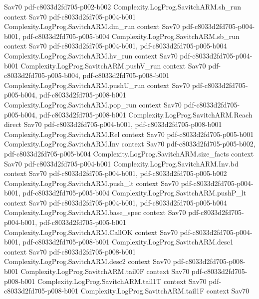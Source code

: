 \begin{theorem}
  {Sav70}
  {pdf-c8033d2fd705-p002-b002}
\proofstep
  {Complexity.LogProg.SavitchARM.sh_run}
  {context}
  {Sav70}
  {pdf-c8033d2fd705-p004-b001}
\proofstep
  {Complexity.LogProg.SavitchARM.dm_run}
  {context}
  {Sav70}
  {pdf-c8033d2fd705-p004-b001,
    pdf-c8033d2fd705-p005-b004}
\proofstep
  {Complexity.LogProg.SavitchARM.sb_run}
  {context}
  {Sav70}
  {pdf-c8033d2fd705-p004-b001,
    pdf-c8033d2fd705-p005-b004}
\proofstep
  {Complexity.LogProg.SavitchARM.hv_run}
  {context}
  {Sav70}
  {pdf-c8033d2fd705-p004-b001}
\proofstep
  {Complexity.LogProg.SavitchARM.pushV_run}
  {context}
  {Sav70}
  {pdf-c8033d2fd705-p005-b004,
    pdf-c8033d2fd705-p008-b001}
\proofstep
  {Complexity.LogProg.SavitchARM.pushU_run}
  {context}
  {Sav70}
  {pdf-c8033d2fd705-p005-b004,
    pdf-c8033d2fd705-p008-b001}
\proofstep
  {Complexity.LogProg.SavitchARM.pop_run}
  {context}
  {Sav70}
  {pdf-c8033d2fd705-p005-b004,
    pdf-c8033d2fd705-p008-b001}
\proofstep
  {Complexity.LogProg.SavitchARM.Reach}
  {direct}
  {Sav70}
  {pdf-c8033d2fd705-p004-b001,
    pdf-c8033d2fd705-p008-b001}
\proofstep
  {Complexity.LogProg.SavitchARM.Rel}
  {context}
  {Sav70}
  {pdf-c8033d2fd705-p005-b001}
\proofstep
  {Complexity.LogProg.SavitchARM.Inv}
  {context}
  {Sav70}
  {pdf-c8033d2fd705-p005-b002,
    pdf-c8033d2fd705-p005-b004}
\proofstep
  {Complexity.LogProg.SavitchARM.size_facts}
  {context}
  {Sav70}
  {pdf-c8033d2fd705-p004-b001}
\proofstep
  {Complexity.LogProg.SavitchARM.Inv.bd}
  {context}
  {Sav70}
  {pdf-c8033d2fd705-p004-b001,
    pdf-c8033d2fd705-p005-b002}
\proofstep
  {Complexity.LogProg.SavitchARM.push_lt}
  {context}
  {Sav70}
  {pdf-c8033d2fd705-p004-b001,
    pdf-c8033d2fd705-p005-b004}
\proofstep
  {Complexity.LogProg.SavitchARM.pushP_lt}
  {context}
  {Sav70}
  {pdf-c8033d2fd705-p004-b001,
    pdf-c8033d2fd705-p005-b004}
\proofstep
  {Complexity.LogProg.SavitchARM.base_spec}
  {context}
  {Sav70}
  {pdf-c8033d2fd705-p004-b001,
    pdf-c8033d2fd705-p005-b001}
\proofstep
  {Complexity.LogProg.SavitchARM.CallOK}
  {context}
  {Sav70}
  {pdf-c8033d2fd705-p004-b001,
    pdf-c8033d2fd705-p008-b001}
\proofstep
  {Complexity.LogProg.SavitchARM.desc1}
  {context}
  {Sav70}
  {pdf-c8033d2fd705-p008-b001}
\proofstep
  {Complexity.LogProg.SavitchARM.desc2}
  {context}
  {Sav70}
  {pdf-c8033d2fd705-p008-b001}
\proofstep
  {Complexity.LogProg.SavitchARM.tail0F}
  {context}
  {Sav70}
  {pdf-c8033d2fd705-p008-b001}
\proofstep
  {Complexity.LogProg.SavitchARM.tail1T}
  {context}
  {Sav70}
  {pdf-c8033d2fd705-p008-b001}
\proofstep
  {Complexity.LogProg.SavitchARM.tail1F}
  {context}
  {Sav70}

\end{theorem}
